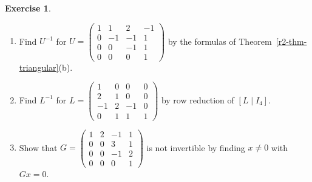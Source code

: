 \documentclass[12pt]{article}
\theoremstyle{definition}
\newtheorem{exercise}{Exercise}
\begin{document}
\begin{exercise}\label{r2-dr-triangular}
\begin{enumerate}
\item Find \(U^{-1}\) for \(U=\begin{pmatrix}1&1&2&-1\\0&-1&-1&1\\0&0&-1&1\\0&0&0&1\end{pmatrix}\) by the formulas
of Theorem~\ref{r2-thm-triangular}(b).
\item Find \(L^{-1}\) for \(L=\begin{pmatrix}1&0&0&0\\2&1&0&0\\-1&2&-1&0\\0&1&1&1\end{pmatrix}\) by row reduction of \([L\mid I_4]\).
\item Show that \(G=\begin{pmatrix}1&2&-1&1\\0&0&3&1\\0&0&-1&2\\0&0&0&1\end{pmatrix}\) is not invertible by finding \(x\ne0\) with \(Gx=0\).
\end{enumerate}
\end{exercise}
\end{document}
